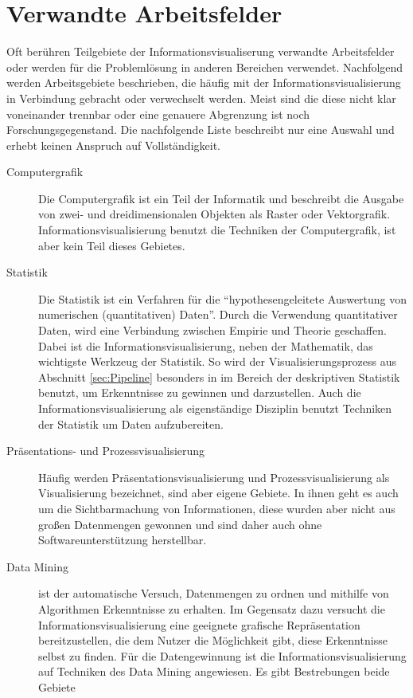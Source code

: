 \documentclass[a4paper, 12pt, DIVcalc, onepage, pdftex, headsepline, footsepline]{scrreprt}
\begin{document}
\section{Verwandte Arbeitsfelder}
\label{sec:Arbeitsfelder}
Oft berühren Teilgebiete der Informationsvisualiserung verwandte Arbeitsfelder oder werden für die Problemlösung
in anderen Bereichen verwendet.
Nachfolgend werden Arbeitsgebiete beschrieben, die häufig mit der Informationsvisualisierung in Verbindung
gebracht oder verwechselt werden. Meist sind die diese nicht klar
voneinander trennbar oder eine genauere Abgrenzung ist noch Forschungsgegenstand. Die nachfolgende Liste beschreibt nur
eine Auswahl und erhebt keinen Anspruch auf Vollständigkeit.
\begin{description}
\item[Computergrafik]
Die Computergrafik ist ein Teil der Informatik und beschreibt die Ausgabe von zwei- und dreidimensionalen
Objekten als Raster oder Vektorgrafik. Informationsvisualisierung benutzt die Techniken der Computergrafik, ist aber kein Teil
dieses Gebietes.
\item[Statistik]
Die Statistik ist ein Verfahren für die "`hypothesengeleitete Auswertung von numerischen (quantitativen)
Daten"'\citep[S.\,23]{Statistik}. Durch die Verwendung quantitativer Daten, wird eine Verbindung zwischen
Empirie und Theorie geschaffen.  Dabei ist die Informationsvisualisierung, neben der Mathematik, das wichtigste
Werkzeug der Statistik. So wird der Visualisierungsprozess aus Abschnitt \ref{sec:Pipeline} besonders in
im Bereich der deskriptiven Statistik benutzt, um Erkenntnisse zu gewinnen und darzustellen.
Auch die Informationsvisualisierung als eigenständige Disziplin benutzt Techniken der Statistik um Daten aufzubereiten.
\item[Präsentations- und Prozessvisualisierung]
Häufig werden Präsentationsvisualisierung und Prozessvisualisierung als Visualisierung bezeichnet, sind
aber eigene Gebiete. In ihnen geht es auch um die Sichtbarmachung von Informationen, diese wurden aber nicht aus
großen Datenmengen gewonnen und sind daher auch ohne Softwareunterstützung herstellbar.
\item[Data Mining] ist der automatische Versuch, Datenmengen zu ordnen und mithilfe
von Algorithmen Erkenntnisse zu erhalten. Im Gegensatz dazu versucht die Informationsvisualisierung eine geeignete grafische Repräsentation
bereitzustellen, die dem Nutzer die Möglichkeit gibt, diese Erkenntnisse selbst zu finden. Für die Datengewinnung
ist die Informationsvisualisierung auf Techniken des Data Mining angewiesen. Es gibt Bestrebungen beide Gebiete 

\end{description}
\end{document}
